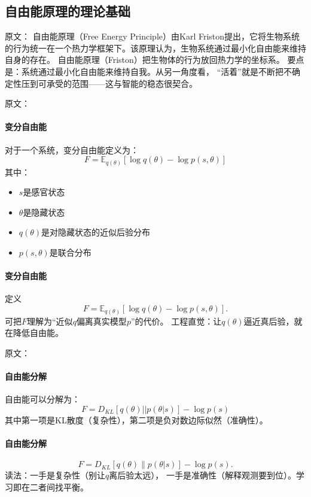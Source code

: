 \subsection{自由能原理的理论基础}

原文：
自由能原理（Free Energy Principle）由Karl Friston提出，它将生物系统的行为统一在一个热力学框架下。该原理认为，生物系统通过最小化自由能来维持自身的存在。
自由能原理（Friston）把生物体的行为放回热力学的坐标系。  
要点是：系统通过最小化自由能来维持自我。\;从另一角度看，  
“活着”就是不断把不确定性压到可承受的范围——\;这与智能的稳态很契合。

原文：
\paragraph{变分自由能}
对于一个系统，变分自由能定义为：
$$F = \mathbb{E}_{q(\theta)}[\log q(\theta) - \log p(s,\theta)]$$
其中：
\begin{itemize}
\item $s$是感官状态
\item $\theta$是隐藏状态
\item $q(\theta)$是对隐藏状态的近似后验分布
\item $p(s,\theta)$是联合分布
\end{itemize}
\paragraph{变分自由能}
定义
$$F=\mathbb{E}_{q(\theta)}[\log q(\theta)-\log p(s,\theta)].$$
可把$F$理解为“近似$q$偏离真实模型$p$”的代价。  
工程直觉：让$q(\theta)$逼近真后验，就在降低自由能。

原文：
\paragraph{自由能分解}
自由能可以分解为：
$$F = D_{KL}[q(\theta)||p(\theta|s)] - \log p(s)$$
其中第一项是KL散度（复杂性），第二项是负对数边际似然（准确性）。
\paragraph{自由能分解}
$$F=D_{KL}[q(\theta)\|p(\theta|s)]-\log p(s).$$
读法：一手是复杂性（别让$q$离后验太远），  
一手是准确性（解释观测要到位）。\;学习即在二者间找平衡。

